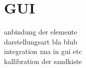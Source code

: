 \chapter{GUI}
\begin{Spacing}{\mylinespace}

anbindung der elemente \\
darstellungsart bla blub\\
integration xna in gui etc\\
kallibration der sandkiste\\


\end{Spacing}
\newpage
\clearpage
